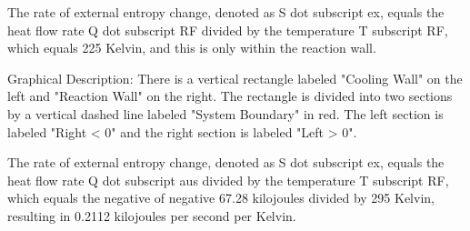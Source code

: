 The rate of external entropy change, denoted as S dot subscript ex, equals the heat flow rate Q dot subscript RF divided by the temperature T subscript RF, which equals 225 Kelvin, and this is only within the reaction wall.

Graphical Description:
There is a vertical rectangle labeled "Cooling Wall" on the left and "Reaction Wall" on the right. The rectangle is divided into two sections by a vertical dashed line labeled "System Boundary" in red. The left section is labeled "Right < 0" and the right section is labeled "Left > 0".

The rate of external entropy change, denoted as S dot subscript ex, equals the heat flow rate Q dot subscript aus divided by the temperature T subscript RF, which equals the negative of negative 67.28 kilojoules divided by 295 Kelvin, resulting in 0.2112 kilojoules per second per Kelvin.
